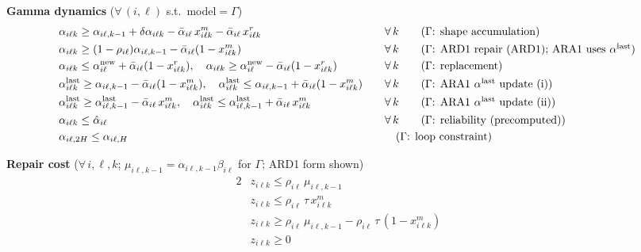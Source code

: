 \documentclass[11pt,a4paper]{article}
\begin{document}
\begin{small}
\vspace{0.3em}
\noindent\textbf{Gamma dynamics} ($\forall\,(i,\ell)$ s.t.\ model$=\Gamma$)
\begin{alignat}{2}
  &\alpha_{i\ell k} \geq \alpha_{i\ell,k-1} + \delta\alpha_{i\ell k}
    - \bar{\alpha}_{i\ell}\,x^m_{i\ell k}
    - \bar{\alpha}_{i\ell}\,x^r_{i\ell k}
  &&\quad\forall\,k \tag{$\Gamma$: shape accumulation} \\
  &\alpha_{i\ell k} \geq (1-\rho_{i\ell})\alpha_{i\ell,k-1}
    - \bar{\alpha}_{i\ell}(1-x^m_{i\ell k})
  &&\quad\forall\,k \tag{$\Gamma$: ARD1 repair (ARD1); ARA1 uses $\alpha^{\mathrm{last}}$} \\
  &\alpha_{i\ell k} \leq \alpha^{\mathrm{new}}_{i\ell}
    + \bar{\alpha}_{i\ell}(1-x^r_{i\ell k}),\quad
   \alpha_{i\ell k} \geq \alpha^{\mathrm{new}}_{i\ell}
    - \bar{\alpha}_{i\ell}(1-x^r_{i\ell k})
  &&\quad\forall\,k \tag{$\Gamma$: replacement} \\
  &\alpha^{\mathrm{last}}_{i\ell k} \geq \alpha_{i\ell,k-1}
    - \bar{\alpha}_{i\ell}(1-x^m_{i\ell k}),\quad
   \alpha^{\mathrm{last}}_{i\ell k} \leq \alpha_{i\ell,k-1}
    + \bar{\alpha}_{i\ell}(1-x^m_{i\ell k})
  &&\quad\forall\,k \tag{$\Gamma$: ARA1 $\alpha^{\mathrm{last}}$ update (i)} \\
  &\alpha^{\mathrm{last}}_{i\ell k} \geq \alpha^{\mathrm{last}}_{i\ell,k-1}
    - \bar{\alpha}_{i\ell}\,x^m_{i\ell k},\quad
   \alpha^{\mathrm{last}}_{i\ell k} \leq \alpha^{\mathrm{last}}_{i\ell,k-1}
    + \bar{\alpha}_{i\ell}\,x^m_{i\ell k}
  &&\quad\forall\,k \tag{$\Gamma$: ARA1 $\alpha^{\mathrm{last}}$ update (ii)} \\
  &\alpha_{i\ell k} \leq \hat{\alpha}_{i\ell}
  &&\quad\forall\,k \tag{$\Gamma$: reliability (precomputed)} \\
  &\alpha_{i\ell,2H} \leq \alpha_{i\ell,H}
  &&\tag{$\Gamma$: loop constraint}
\end{alignat}

\vspace{0.3em}
\noindent\textbf{Repair cost} ($\forall\,i,\ell,k$; $\mu_{i\ell,k-1}=\alpha_{i\ell,k-1}\beta_{i\ell}$ for $\Gamma$; ARD1 form shown)
\begin{alignat}{2}
  &z_{i\ell k} \leq \rho_{i\ell}\,\mu_{i\ell,k-1}
  &&\tag{repair proxy (i)} \\
  &z_{i\ell k} \leq \rho_{i\ell}\,\tau\,x^m_{i\ell k}
  &&\tag{repair proxy (ii)} \\
  &z_{i\ell k} \geq \rho_{i\ell}\,\mu_{i\ell,k-1} - \rho_{i\ell}\,\tau\,(1-x^m_{i\ell k})
  &&\tag{repair proxy (iii)} \\
  &z_{i\ell k} \geq 0
  &&\tag{repair proxy (iv)}
\end{alignat}


\end{small}
\end{document}
